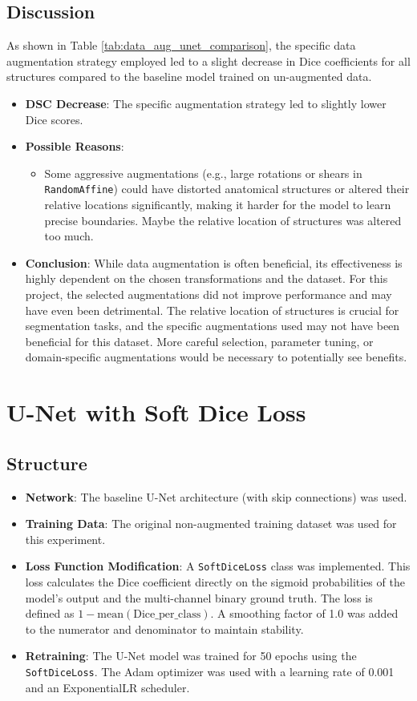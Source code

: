 \documentclass{article}
\begin{document}
\subsection{Discussion}
As shown in Table \ref{tab:data_aug_unet_comparison}, the specific data augmentation strategy employed led to a slight decrease in Dice coefficients for all structures compared to the baseline model trained on un-augmented data.
\begin{itemize}
  \item \textbf{DSC Decrease}: The specific augmentation strategy led to slightly lower Dice scores.
  \item \textbf{Possible Reasons}:
        \begin{itemize}
          \item Some aggressive augmentations (e.g., large rotations or shears in \texttt{RandomAffine}) could have distorted anatomical structures or altered their relative locations significantly, making it harder for the model to learn precise boundaries. Maybe the relative location of structures was altered too much.
        \end{itemize}
  \item \textbf{Conclusion}: While data augmentation is often beneficial, its effectiveness is highly dependent on the chosen transformations and the dataset. For this project, the selected augmentations did not improve performance and may have even been detrimental. The relative location of structures is crucial for segmentation tasks, and the specific augmentations used may not have been beneficial for this dataset. More careful selection, parameter tuning, or domain-specific augmentations would be necessary to potentially see benefits.
\end{itemize}


\section{U-Net with Soft Dice Loss}

\subsection{Structure}
\begin{itemize}
  \item \textbf{Network}: The baseline U-Net architecture (with skip connections) was used.
  \item \textbf{Training Data}: The original non-augmented training dataset was used for this experiment.
  \item \textbf{Loss Function Modification}: A \texttt{SoftDiceLoss} class was implemented. This loss calculates the Dice
        coefficient directly on the sigmoid probabilities of the model's output and the multi-channel binary ground truth. The
        loss is defined as $1 - \text{mean}(\text{Dice\_per\_class})$. A smoothing factor of 1.0 was added to the numerator and
        denominator to maintain stability.
  \item \textbf{Retraining}: The U-Net model was trained for 50 epochs using the \texttt{SoftDiceLoss}. The Adam optimizer was used with a learning rate of 0.001 and an ExponentialLR scheduler.
\end{itemize}
\end{document}
